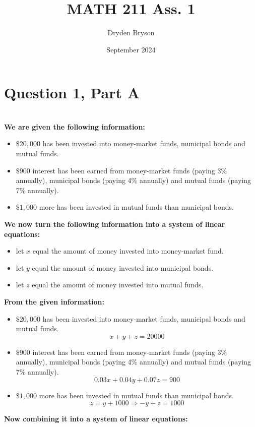 \documentclass{article}
\title{MATH 211 Ass. 1}
\author{Dryden Bryson}
\date{September 2024}
\begin{document}
\maketitle
\newpage
\section*{Question 1, Part A}\\
\textbf{We are given the following information:}

\begin{itemize}
    \begin{itemize}
        \item $\$20,000$ has been invested into money-market funds, municipal bonds and mutual funds.
        \item $\$900$ interest has been earned from money-market funds (paying 3\% annually), municipal bonds (paying 4\% annually) and mutual funds (paying 7\% annually).
        \item $\$1,000$ more  has been invested in mutual funds than municipal bonds.
    \end{itemize}
\end{itemize}

\textbf{We now turn the following information into a system of linear equations:}
\begin{itemize}
    \begin{itemize}
        \item let $x$ equal the amount of money invested into money-market fund.
        \item let $y$ equal the amount of money invested into municipal bonds.
        \item let $z$ equal the amount of money invested into mutual funds.
    \end{itemize}
\end{itemize}

\textbf{From the given information:}
\begin{itemize}
    \begin{itemize}
        \item $\$20,000$ has been invested into money-market funds, municipal bonds and mutual funds.
        $$x+y+z=20000$$
        \item $\$900$ interest has been earned from money-market funds (paying 3\% annually), municipal bonds (paying 4\% annually) and mutual funds (paying 7\% annually).
        $$0.03x+0.04y+0.07z=900$$
        \item $\$1,000$ more  has been invested in mutual funds than municipal bonds.
        $$z=y+1000 \Rightarrow -y+z=1000$$
    \end{itemize}
\end{itemize}
\textbf{Now combining it into a system of linear equations:}
\end{document}
